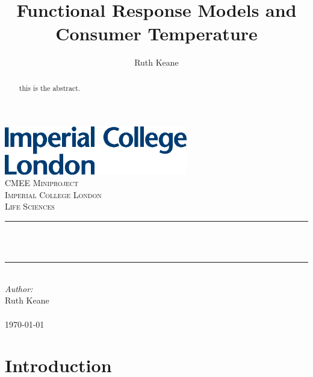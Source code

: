 \documentclass{article}
\newcommand{\HRule}{\rule{\linewidth}{1mm}}
\begin{document}
\title{Functional Response Models and Consumer Temperature}%
\author{Ruth Keane}

\begin{titlepage}
\includegraphics[width=8cm]{logo.eps}\\[1cm] 
\center 
\textsc{\LARGE CMEE Miniproject}\\[1.5cm] 
\textsc{\Large Imperial College London}\\[0.5cm]
\textsc{\large Life Sciences}\\[0.5cm] 
\makeatletter
\HRule \\[0.4cm]
{ \huge \bfseries \@title}\\[0.4cm] %
\HRule \\[1.5cm]
\makeatother
\Large \emph{Author:}\\
Ruth Keane \\[3cm] %
\\
{\large \today}\\[2cm] %
\vfill %
\clearpage
\end{titlepage}
\tableofcontents
\newpage
\linenumbers
\begin{abstract}
this is the abstract.
\end{abstract}
\section{Introduction}
\end{document}
